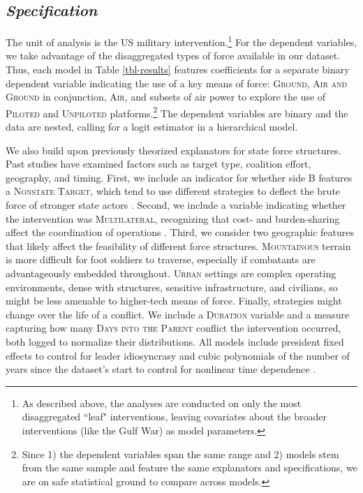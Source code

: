 \documentclass[fleqn,12pt]{article}
\begin{document}
\subsection*{\textit{Specification}}
The unit of analysis is the US military intervention.\footnote{As described above, the analyses are conducted on only the most disaggregated ``leaf" interventions, leaving covariates about the broader interventions (like the Gulf War) as model parameters.} For the dependent variables, we take advantage of the disaggregated types of force available in our dataset. Thus, each model in Table \ref{tbl-results} features coefficients for a separate binary dependent variable indicating the use of a key means of force: \textsc{Ground}, \textsc{Air and Ground} in conjunction, \textsc{Air}, and subsets of air power to explore the use of \textsc{Piloted} and \textsc{Unpiloted} platforms.\footnote{Since 1) the dependent variables span the same range and 2) models stem from the same sample and feature the same explanators and specifications, we are on safe statistical ground to compare across models.} The dependent variables are binary and the data are nested, calling for a logit estimator in a hierarchical model. 

We also build upon previously theorized explanators for state force structures. Past studies have examined factors such as target type, coalition effort, geography, and timing. First, we include an indicator for whether side B features a \textsc{Nonstate Target}, which tend to use different strategies to deflect the brute force of stronger state actors \citep{Arreguin01}. Second, we include a variable indicating whether the intervention was \textsc{Multilateral}, recognizing that cost- and burden-sharing affect the coordination of operations \citep{CZGrayer22}. Third, we consider two geographic features that likely affect the feasibility of different force structures. \textsc{Mountainous} terrain is more difficult for foot soldiers to traverse, especially if combatants are advantageously embedded throughout. \textsc{Urban} settings are complex operating environments, dense with structures, sensitive infrastructure, and civilians, so might be less amenable to higher-tech means of force. Finally, strategies might change over the life of a conflict. We include a \textsc{Duration} variable and a measure capturing how many \textsc{Days into the Parent} conflict the intervention occurred, both logged to normalize their distributions. All models include president fixed effects to control for leader idiosyncrasy and cubic polynomials of the number of years since the dataset's start to control for nonlinear time dependence \citep{CarterSignorino10}.
\end{document}
